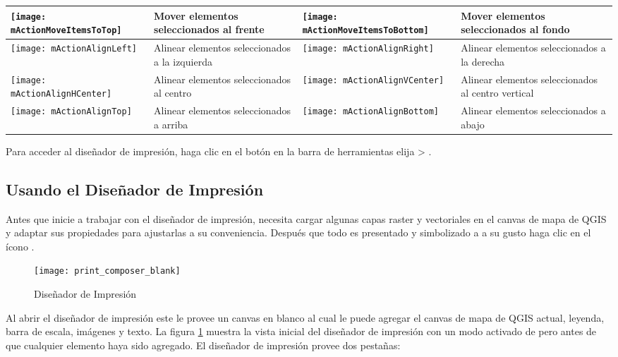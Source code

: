\begin{table}[h]
\begin{tabular}{|l|p{6.9cm}|l|p{6.9cm}|}
 \hline \texttt{[image: mActionMoveItemsToTop]} & Mover elementos
 seleccionados al frente & 
 \texttt{[image: mActionMoveItemsToBottom]} & Mover elementos
 seleccionados al fondo \\
 \hline \texttt{[image: mActionAlignLeft]} & Alinear elementos 
 seleccionados a la izquierda &
 \texttt{[image: mActionAlignRight]} & Alinear elementos seleccionados 
 a la derecha \\
 \hline \texttt{[image: mActionAlignHCenter]} & Alinear elementos 
 seleccionados al centro &
 \texttt{[image: mActionAlignVCenter]} & Alinear elementos seleccionados
 al centro vertical \\
 \hline \texttt{[image: mActionAlignTop]} & Alinear elementos
 seleccionados a arriba &
 \texttt{[image: mActionAlignBottom]} & Alinear elementos
 seleccionados a abajo \\
\hline
\end{tabular}
\end{table}

Para acceder al diseñador de impresión, haga clic en el botón 
en la barra de herramientas elija  > .

\subsection{Usando el Diseñador de Impresión}\label{label_useprintcomposer} 

Antes que inicie a trabajar con el diseñador de impresión, necesita cargar algunas 
capas raster y vectoriales en el canvas de mapa de QGIS y adaptar sus propiedades 
para ajustarlas a su conveniencia. Después que todo es presentado y simbolizado a 
a su gusto haga clic en el ícono .

\begin{figure}[ht]
   \begin{center}
   \caption{Diseñador de Impresión \nixcaption}\label{fig:print_composer_blank}\smallskip
   \texttt{[image: print\_composer\_blank]}
\end{center}  
\end{figure}

Al abrir el diseñador de impresión este le provee un canvas en blanco al cual le puede
agregar el canvas de mapa de QGIS actual, leyenda, barra de escala, imágenes y texto. La figura
\ref{fig:print_composer_blank} muestra la vista inicial del diseñador de impresión 
con un modo activado de  pero antes de que cualquier elemento haya
sido agregado. El diseñador de impresión provee dos pestañas:

